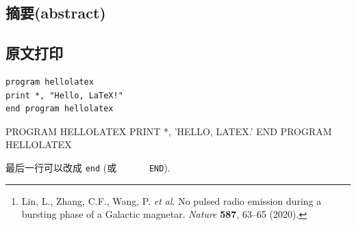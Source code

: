 \documentclass{ctexart}
\begin{document}
    \subsection{摘要(abstract)}
    \begin{abstract}
        Fast radio bursts (FRBs) are millisecond-duration radio transients of
        unknown physical origin observed at extragalactic distances.
        It has long been speculated that magnetars are the engine powering
        repeating bursts from FRB sources, but no convincing evidence has been
        collected so far.
        Recently, the Galactic magnetar SRG 1935+2154 entered an active phase
        by emitting intense soft $\gamma$-ray bursts.
        One FRB-like event with two peaks (FRB 200428) and a luminosity
        slightly lower than the faintest extragalactic FRBs was detected from
        the source, in association with a soft $\gamma$-ray/hard-X-ray flare.
        Here we report an eight-hour targeted radio observational campaign
        comprising four sessions and assisted by multi-wavelength (optical and
        hard-X-ray) data.
        During the third session, 29 soft-$\gamma$-ray repeater (SGR) bursts
        were detected in $\gamma$-ray energies.
        Throughout the observing period, we detected no single dispersed pulsed
        emission coincident with the arrivals of SGR bursts, but unfortunately
        we were not observing when the FRB was detected.
        The non-detection places a fluence upper limit that is eight orders of
        magnitude lower than the fluence of FRB 200428.
        Our results suggest that FRB-SGR burst associations are rare.
        FRBs may be highly relativistic and geometrically beamed, or FRB-like
        events associated with SGR bursts may have narrow spectra and
        characteristic frequencies outside the observed band.
        It is also possible that the physical conditions required to achieve
        coherent radiation in SGR bursts are difficult to satisfy, and that
        only under extreme conditions could an FRB be associated with an SGR
        burst.\footnote{
            Lin, L., Zhang, C.F., Wang, P. \textit{et al}.
            No pulsed radio emission during a bursting phase of a Galactic 
            magnetar.
            \textit{Nature} \textbf{587}, 63--65 (2020).}
    \end{abstract}
    \subsection{原文打印}
\begin{verbatim}
program hellolatex
print *, "Hello, LaTeX!"
end program hellolatex
\end{verbatim}
\begin{verbatim*}
      PROGRAM HELLOLATEX
      PRINT *, 'HELLO, LATEX.'
      END PROGRAM HELLOLATEX
\end{verbatim*}
    最后一行可以改成 \verb|end| (或 \verb*|      END|).
\end{document}
